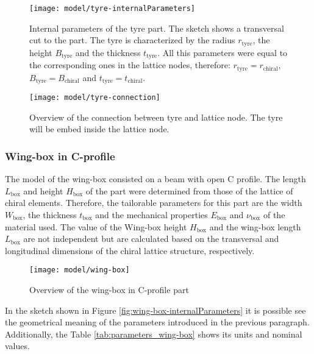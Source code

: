 \begin{figure}[!htpb]
  \centering
  \texttt{[image: model/tyre-internalParameters]}
  \caption[Internal parameters of the tyre part]{Internal parameters of the tyre part. The sketch shows a transversal cut to the part. The tyre is characterized by the radius $r_{\mathrm{tyre}}$, the height $B_{\mathrm{tyre}}$ and the thickness $t_{\mathrm{tyre}}$. All this parameters were equal to the corresponding ones in the lattice nodes, therefore: $r_{\mathrm{tyre}} = r_{\mathrm{chiral}}$, $B_{\mathrm{tyre}} = B_{\mathrm{chiral}}$ and $t_{\mathrm{tyre}} = t_{\mathrm{chiral}}$.}\label{fig:tyre-internalParameters}
\end{figure}

\begin{figure}[!htpb]
  \centering
  \texttt{[image: model/tyre-connection]}
  \caption[Overview of the connection between tyre and lattice node]{Overview of the connection between tyre and lattice node. The tyre will be embed inside the lattice node.}\label{fig:tyre-connection}
\end{figure}

\clearpage
\subsubsection{Wing-box in C-profile} \label{subsubsec:wingBox_Parametrization}

The model of the wing-box consisted on a beam with open C profile. The length $L_{\mathrm{box}}$ and height $H_{\mathrm{box}}$ of the part were determined from those of the lattice of chiral elements. Therefore, the tailorable parameters for this part are the width $W_{\mathrm{box}}$, the thickness $t_{\mathrm{box}}$ and the mechanical properties $E_{\mathrm{box}}$ and $\nu_{\mathrm{box}}$ of the material used. The value of the Wing-box height $H_{\mathrm{box}}$ and the wing-box length $L_{\mathrm{box}}$ are not independent but are calculated based on the transversal and longitudinal dimensions of the chiral lattice structure, respectively.

\begin{figure}[!htpb]
  \centering
  \texttt{[image: model/wing-box]}
  \caption[Overview of the wing-box in C-profile part]{Overview of the wing-box in C-profile part}\label{fig:wing-box}
\end{figure}

In the sketch shown in Figure \ref{fig:wing-box-internalParameters} it is possible see the geometrical meaning of the parameters introduced in the previous paragraph. Additionally, the Table \ref{tab:parameters_wing-box} shows its units and nominal values.

